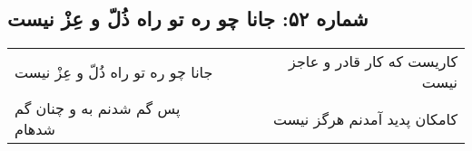 \begin{center}
\section*{شماره ۵۲: جانا چو ره تو راه ذُلّ و عِزْ نیست}
\label{sec:052}
\begin{longtable}{l p{0.5cm} r}
جانا چو ره تو راه ذُلّ و عِزْ نیست
&&
کاریست که کار قادر و عاجز نیست
\\
پس گم شدنم به و چنان گم شدهام
&&
کامکان پدید آمدنم هرگز نیست
\\
\end{longtable}
\end{center}
